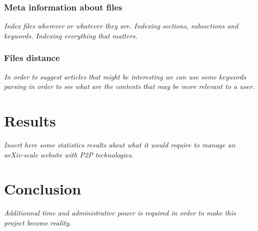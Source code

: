 \subsubsection{Meta information about files}

\textit{Index files wherever or whatever they are. Indexing sections, subsections
and keywords. Indexing everything that matters.}

\subsubsection{Files distance}

\textit{In order to suggest articles that might be interesting we can use
some keywords parsing in order to see what are the contents that may be more
relevant to a user.}

\section{Results}

\textit{Insert here some statistics results about what 
it would require to manage an arXiv-scale website with P2P technologies.}

\section{Conclusion}

\textit{Additionnal time and administrative power is required in order to
make this project become reality.}

